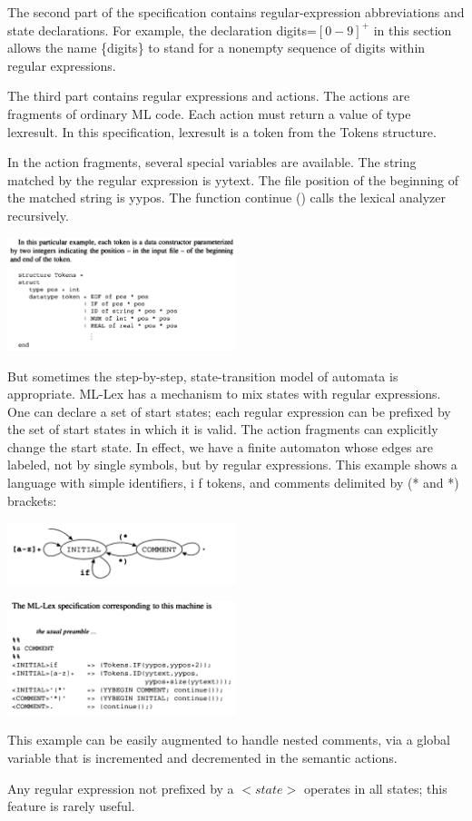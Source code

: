 \documentclass[8pt, a4paper, oneside, twocolumn]{extarticle}
\begin{document}
The second part of the specification contains regular-expression  
abbreviations and state declarations. For example, the declaration digits=$[0-9]^+$ 
in this section allows the name \{digits\} to stand for a nonempty sequence 
of digits within regular expressions. 

The third part contains regular expressions and actions. The actions are 
fragments of ordinary ML code. Each action must return a value of type 
lexresult. In this specification, lexresult is a token from the Tokens 
structure. 

In the action fragments, several special variables are available. The string 
matched by the regular expression is yytext. The file position of the  
beginning of the matched string is yypos. The function continue () calls the 
lexical analyzer recursively. 

\includegraphics[width=0.5\textwidth,height=0.5\textheight,keepaspectratio]{lex2}

But sometimes the step-by-step, state-transition model of automata is  
appropriate. ML-Lex has a mechanism to mix states with regular expressions. 
One can declare a set of start states; each regular expression can be prefixed 
by the set of start states in which it is valid. The action fragments can  
explicitly change the start state. In effect, we have a finite automaton whose edges 
are labeled, not by single symbols, but by regular expressions. This example 
shows a language with simple identifiers, i f tokens, and comments delimited 
by (* and *) brackets: 

\includegraphics[width=0.5\textwidth,height=0.5\textheight,keepaspectratio]{lex3}

\includegraphics[width=0.5\textwidth,height=0.5\textheight,keepaspectratio]{lex4}

This example can be easily augmented to handle nested comments, via a 
global variable that is incremented and decremented in the semantic actions. 

Any regular expression not prefixed by a $<state>$ operates in all states; this  
feature is rarely useful. 
\end{document}
